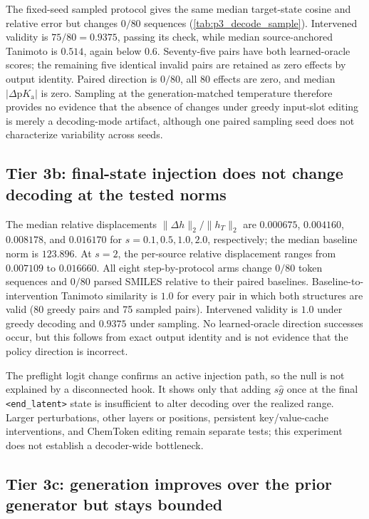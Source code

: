 \documentclass[11pt]{article}
\newcommand{\pka}{\mathrm{p}K_{\mathrm a}}
\begin{document}
The fixed-seed sampled protocol gives the same median target-state cosine and relative error but changes $0/80$ sequences (\cref{tab:p3_decode_sample}). Intervened validity is $75/80=0.9375$, passing its check, while median source-anchored Tanimoto is $0.514$, again below $0.6$. Seventy-five pairs have both learned-oracle scores; the remaining five identical invalid pairs are retained as zero effects by output identity. Paired direction is $0/80$, all 80 effects are zero, and median $|\Delta\pka|$ is zero. Sampling at the generation-matched temperature therefore provides no evidence that the absence of changes under greedy input-slot editing is merely a decoding-mode artifact, although one paired sampling seed does not characterize variability across seeds.

\subsection{Tier 3b: final-state injection does not change decoding at the tested norms}
\label{sec:hidden_injection_results}

The median relative displacements $\lVert\Delta h\rVert_2/\lVert h_T\rVert_2$ are $0.000675$, $0.004160$, $0.008178$, and $0.016170$ for $s=0.1,0.5,1.0,2.0$, respectively; the median baseline norm is $123.896$. At $s=2$, the per-source relative displacement ranges from $0.007109$ to $0.016660$. All eight step-by-protocol arms change $0/80$ token sequences and $0/80$ parsed SMILES relative to their paired baselines. Baseline-to-intervention Tanimoto similarity is $1.0$ for every pair in which both structures are valid (80 greedy pairs and 75 sampled pairs). Intervened validity is $1.0$ under greedy decoding and $0.9375$ under sampling. No learned-oracle direction successes occur, but this follows from exact output identity and is not evidence that the policy direction is incorrect.

The preflight logit change confirms an active injection path, so the null is not explained by a disconnected hook. It shows only that adding $s\hat g$ once at the final \texttt{<end\_latent>} state is insufficient to alter decoding over the realized range. Larger perturbations, other layers or positions, persistent key/value-cache interventions, and ChemToken editing remain separate tests; this experiment does not establish a decoder-wide bottleneck.

\subsection{Tier 3c: generation improves over the prior generator but stays bounded}
\end{document}
